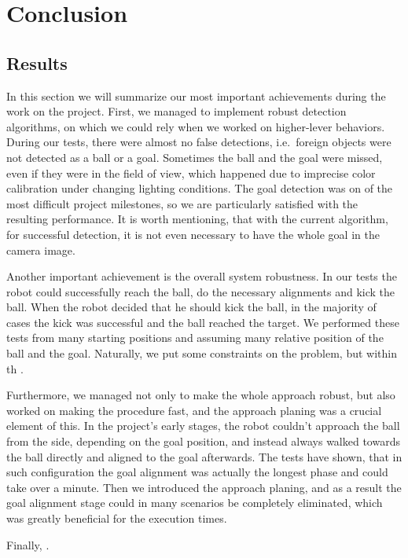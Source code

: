 \chapter{Conclusion}

\section{Results}

In this section we will summarize our most important achievements during the
work on the project. First, we managed to implement robust detection
algorithms, on which we could rely when we worked on higher-lever behaviors.
During our tests, there were almost no false detections, i.e.\ foreign objects
were not detected as a ball or a goal. Sometimes the ball and the goal were
missed, even if they were in the field of view, which happened due to imprecise
color calibration under changing lighting conditions. The goal detection was on
of the most difficult project milestones, so we are particularly satisfied with
the resulting performance. It is worth mentioning, that with the current
algorithm, for successful detection, it is not even necessary to have the whole
goal in the camera image.

Another important achievement is the overall system robustness. In our tests
the robot could successfully reach the ball, do the necessary alignments and
kick the ball. When the robot decided that he should kick the ball, in the
majority of cases the kick was successful and the ball reached the target. We
performed these tests from many starting positions and assuming many relative
position of the ball and the goal. Naturally, we put some constraints on the
problem, but within th .

Furthermore, we managed not only to make the whole approach robust, but also
worked on making the procedure fast, and the approach planing was a crucial
element of this. In the project's early stages, the robot couldn't approach the
ball from the side, depending on the goal position, and instead always walked
towards the ball directly and aligned to the goal afterwards. The tests have
shown, that in such configuration the goal alignment was actually the longest
phase and could take over a minute. Then we introduced the approach planing,
and as a result the goal alignment stage could in many scenarios be completely
eliminated, which was greatly beneficial for the execution times.

Finally, .


